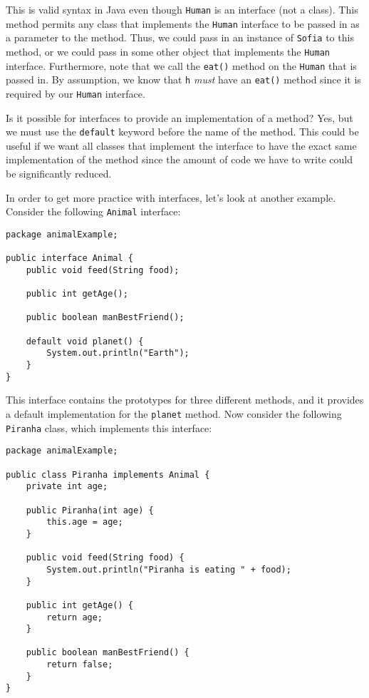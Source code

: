This is valid syntax in Java even though \verb!Human! is an interface (not a class). This method permits any class that implements the \verb!Human! interface to be passed in as a parameter to the method. Thus, we could pass in an instance of \verb!Sofia! to this method, or we could pass in some other object that implements the \verb!Human! interface. Furthermore, note that we call the \verb!eat()! method on the \verb!Human! that is passed in. By assumption, we know that \verb!h! \textit{must} have an \verb!eat()! method since it is required by our \verb!Human! interface.


Is it possible for interfaces to provide an implementation of a method? Yes, but we must use the \verb!default! keyword before the name of the method. This could be useful if we want all classes that implement the interface to have the exact same implementation of the method since the amount of code we have to write could be significantly reduced.

In order to get more practice with interfaces, let's look at another example. Consider the following \verb!Animal! interface:

\begin{lstlisting}
package animalExample;

public interface Animal {
	public void feed(String food);

	public int getAge();

	public boolean manBestFriend();

	default void planet() {
		System.out.println("Earth");
	}
}
\end{lstlisting}

This interface contains the prototypes for three different methods, and it provides a default implementation for the \verb!planet! method. Now consider the following \verb!Piranha! class, which implements this interface:

\begin{lstlisting}
package animalExample;

public class Piranha implements Animal {
	private int age;

	public Piranha(int age) {
		this.age = age;
	}

	public void feed(String food) {
		System.out.println("Piranha is eating " + food);
	}

	public int getAge() {
		return age;
	}

	public boolean manBestFriend() {
		return false;
	}
}
\end{lstlisting}

